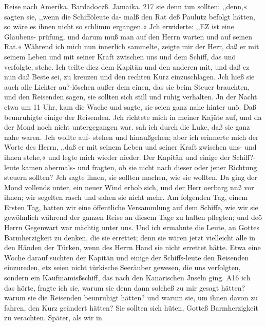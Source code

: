 Reise nach Amerika. Bardadoczß. Jamaika. 217
sie denn tun sollten: ,,denn,« sagten sie, ,,wenn die Schifföleute da-
malß den Rat deß Paulutz befolgt hätten, so wäre es ihnen
nicht so schlimm ergangen.« Jch erwiderte: ,,EZ ist eine Glaubens-
prüfung, und darum muß man auf den Herrn warten und auf
seinen Rat.« Während ich mich nun innerlich sammelte, zeigte
mir der Herr, daß er mit seinem Leben und mit seiner Kraft
zwischen uns und dem Schiff, das unö verfolgte, stehe. Ich
teilte diez dem Kapitän und den anderen mit, und daß ez nun
daß Beste sei, zu kreuzen und den rechten Kurz einzuschlagen.
Jch hieß sie auch alle Lichter au?-löschen außer dem einen, das
sie beim Steuer brauchten, und den Reisenden sagen, sie sollten
sich still und ruhig verhalten. Jn der Nacht etwa um 11 Uhr,
kam die Wache und sagte, sie seien ganz nahe hinter unö. Daß
beunruhigte einige der Reisenden. Jch richtete mich in meiner
Kajüte auf, und da der Mond noch nicht untergegangen war. sah
ich durch die Luke, daß sie ganz nahe waren. Jch wollte auf-
stehen und hinaußgehen; aber ich erinnerte mich der Worte des
Herrn, ,,daß er mit seinem Leben und seiner Kraft zwischen uns-
und ihnen stehe,« und legte mich wieder nieder. Der Kapitän
und einige der Schiff?-leute kamen abermals- und fragten, ob sie
nicht nach dieser oder jener Richtung steuern sollten? Jch sagte
ihnen, sie sollten machen, wie sie wollten. Da ging der Mond
vollends unter, ein neuer Wind erhob sich, und der Herr oerbarg
nnß vor ihnen; wir segelten rasch und sahen sie nicht mehr. Am
folgenden Tag, einem Ersten Tag, hatten wir eine öffentliche
Versammlung auf dem Schiffe, wie wir sie gewöhnlich während
der ganzen Reise an diesem Tage zu halten pflegten; und deö
Herrn Gegenwart war mächtig unter uns. Und ich ermahnte die
Leute, an Gottes Barmherzigkeit zu denken, die sie errettet; denn
sie wären jetzt vielleicht alle in den Händen der Türken, wenn
des Herrn Hand sie nicht errettet hätte. Etwa eine Woche
darauf suchten der Kapitän und einige der Schiffs-leute den
Reisenden einzureden, etz seien nicht türkische Seeräuber gewesen,
die uns verfolgten, sondern ein Kaufmamisßschiff, das nach den
Kanarischen Jnseln ging. A16 ich das hörte, fragte ich sie,
warum sie denn dann solcheß zu mir gesagt hätten? warum sie
die Reisenden beunruhigt hätten? und warum sie, um ihnen
davon zu fahren, den Kurz geändert hätten? Sie sollten sich
hüten, Gotteß Barmherzigkeit zu verachten. Später, als wir in


